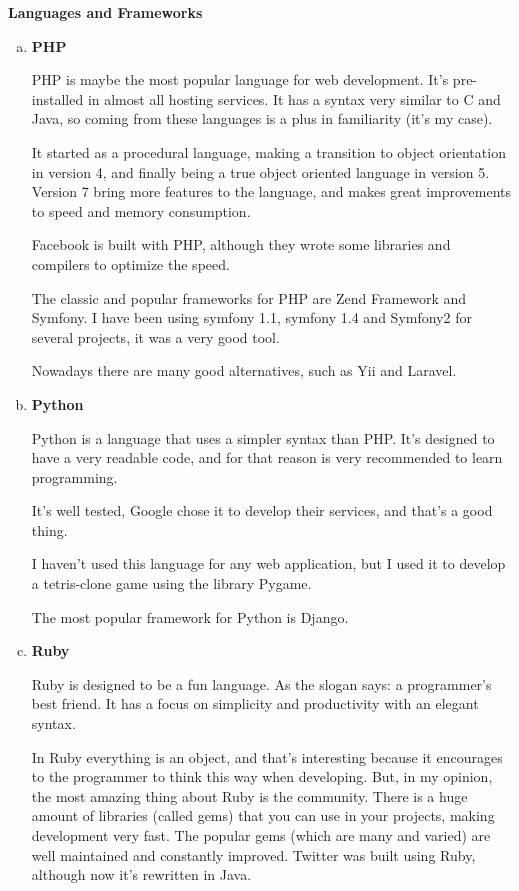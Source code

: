 \documentclass[paper.tex]{subfiles}
\begin{document}
\bigbreak
\textbf{Languages and Frameworks}
\medbreak
\begin{enumerate}[a.]
\item \textbf{PHP}
  \par
  PHP is maybe the most popular language for web development. It’s pre-installed in almost all hosting services. It has a syntax very similar to C and Java, so coming from these languages is a plus in familiarity (it’s my case).

  It started as a procedural language, making a transition to object orientation in version 4, and finally being a true object oriented language in version 5. Version 7 bring more features to the language, and makes great improvements to speed and memory consumption.

  Facebook is built with PHP, although they wrote some libraries and compilers to optimize the speed.

  The classic and popular frameworks for PHP are Zend Framework and Symfony. I have been using symfony 1.1, symfony 1.4 and Symfony2 for several projects, it was a very good tool.

  Nowadays there are many good alternatives, such as Yii and Laravel.
  \medbreak

\item \textbf{Python}
  \par
  Python is a language that uses a simpler syntax than PHP. It’s designed to have a very readable code, and for that reason is very recommended to learn programming.

  It’s well tested, Google chose it to develop their services, and that’s a good thing.

  I haven’t used this language for any web application, but I used it to develop a tetris-clone game using the library Pygame.

  The most popular framework for Python is Django.
  \medbreak

\item \textbf{Ruby}
  \par
  Ruby is designed to be a fun language. As the slogan says: a programmer’s best friend. It has a focus on simplicity and productivity with an elegant syntax.

  In Ruby everything is an object, and that’s interesting because it encourages to the programmer to think this way when developing.
  But, in my opinion, the most amazing thing about Ruby is the community. There is a huge amount of libraries (called gems) that you can use in your projects, making development very fast. The popular gems (which are many and varied) are well maintained and constantly improved.
  Twitter was built using Ruby, although now it’s rewritten in Java.


\end{enumerate}
\end{document}
